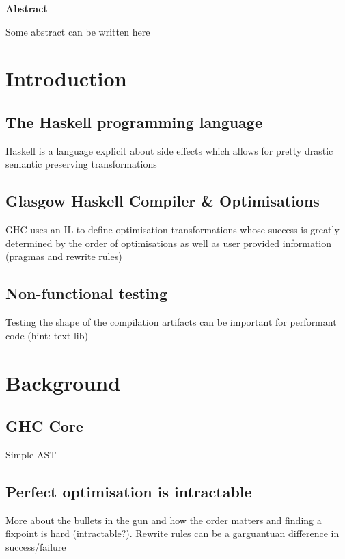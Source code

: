 \documentclass{report}
\begin{document}
\vspace*{\fill}
\begin{center}
\begin{minipage}{.7\textwidth}
\centerline{\textbf{Abstract}}
Some abstract can be written here
\end{minipage}
\end{center}
\vfill %

\thispagestyle{empty}

\newpage
\clearpage
{}
\tableofcontents

\newpage
\clearpage
{}


\newpage

\chapter{Introduction}
\section{The Haskell programming language}
Haskell is a language explicit about side effects which allows for pretty drastic semantic preserving transformations
\section{Glasgow Haskell Compiler \& Optimisations}
GHC uses an IL to define optimisation transformations whose success is greatly determined by the order of optimisations as
well as user provided information (pragmas and rewrite rules)
\section{Non-functional testing}
Testing the shape of the compilation artifacts can be important for performant code (hint: text lib)

\chapter{Background}
\section{GHC Core}
Simple AST
\section{Perfect optimisation is intractable}
More about the bullets in the gun and how the order matters and finding a fixpoint is hard (intractable?). Rewrite rules
can be a garguantuan difference in success/failure 
\end{document}

